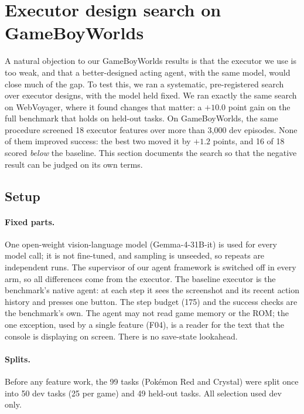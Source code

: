 
\section{Executor design search on GameBoyWorlds}
\label{app:gameboy-executor-search}

A natural objection to our GameBoyWorlds results is that the executor we use is too weak, and that a better-designed
acting agent, with the same model, would close much of the gap. To test this, we ran a systematic, pre-registered
search over executor designs, with the model held fixed. We ran exactly the same search on WebVoyager, where it found
changes that matter: a $+10.0$ point gain on the full benchmark that holds on held-out tasks. On GameBoyWorlds, the
same procedure screened 18 executor features over more than 3{,}000 dev episodes. None of them improved success: the
best two moved it by $+1.2$ points, and 16 of 18 scored \emph{below} the baseline. This section documents the search
so that the negative result can be judged on its own terms.

\subsection{Setup}

\paragraph{Fixed parts.} One open-weight vision-language model (Gemma-4-31B-it) is used for every model call; it is
not fine-tuned, and sampling is unseeded, so repeats are independent runs. The supervisor of our agent framework is
switched off in every arm, so all differences come from the executor. The baseline executor is the benchmark's native
agent: at each step it sees the screenshot and its recent action history and presses one button. The step budget
(175) and the success checks are the benchmark's own. The agent may not read game memory or the ROM; the one
exception, used by a single feature (F04), is a reader for the text that the console is displaying on screen. There is
no save-state lookahead.

\paragraph{Splits.} Before any feature work, the 99 tasks (Pok\'emon Red and Crystal) were split once into 50 dev
tasks (25 per game) and 49 held-out tasks. All selection used dev only.

